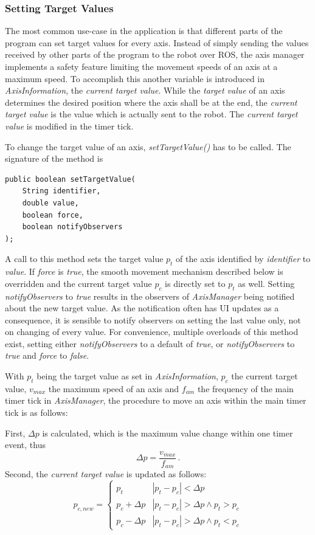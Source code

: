 \subsubsection{Setting Target Values}

The most common use-case in the application is that different parts of the program can set target values for every axis. Instead of simply sending the values received by other parts of the program to the robot over ROS, the axis manager implements a safety feature limiting the movement speeds of an axis at a maximum speed. To accomplish this another variable is introduced in \textit{AxisInformation}, the \textit{current target value}. While the \textit{target value} of an axis determines the desired position where the axis shall be at the end, the \textit{current target value} is the value which is actually sent to the robot. The \textit{current target value} is modified in the timer tick.

To change the target value of an axis, \textit{setTargetValue()} has to be called. The signature of the method is
\begin{lstlisting}[caption={Signature of setTargetValue()}, label=lst:impl:settargetval]
public boolean setTargetValue(
	String identifier, 
	double value, 
	boolean force,
	boolean notifyObservers
);
\end{lstlisting}
A call to this method sets the target value $p_t$ of the axis identified by \textit{identifier} to \textit{value}. If \textit{force} is \textit{true}, the smooth movement mechanism described below is overridden and the current target value $p_c$ is directly set to $p_t$ as well. Setting \textit{notifyObservers} to \textit{true} results in the observers of \textit{AxisManager} being notified about the new target value. As the notification often has UI updates as a consequence, it is sensible to notify observers on setting the last value only, not on changing of every value. For convenience, multiple overloads of this method exist, setting either \textit{notifyObservers} to a default of \textit{true}, or \textit{notifyObservers} to \textit{true} and \textit{force} to \textit{false}.

With $p_t$ being the target value as set in \textit{AxisInformation}, $p_c$ the current target value, $v_{max}$ the maximum speed of an axis and $f_{am}$ the frequency of the main timer tick in \textit{AxisManager}, the procedure to move an axis within the main timer tick is as follows:

First, $\Delta p$ is calculated, which is the maximum value change within one timer event, thus
\begin{equation*}
\Delta p = \frac{v_{max}}{f_{am}} \, .
\end{equation*}
Second, the \textit{current target value} is updated as follows:
\begin{equation*}
p_{c,new} = \left\{ 
\begin{array}{ll}
p_t & |p_t - p_c| < \Delta p \\
p_c + \Delta p & |p_t - p_c| > \Delta p \land p_t > p_c \\
p_c - \Delta p & |p_t - p_c| > \Delta p \land p_t < p_c
\end{array}
 \right.
\end{equation*}

